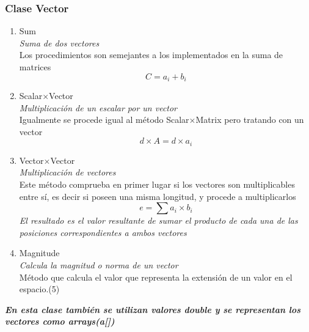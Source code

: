 \documentclass[options]{article}
\begin{document}
\subsubsection{Clase Vector}
\begin{enumerate}
    \item Sum\\
    \textit{Suma de dos vectores}\\
    Los procedimientos son semejantes a los implementados en la suma de matrices
    \begin{equation}
        C = a_{i} + b_{i}
    \end{equation}
    \item Scalar$\times $Vector\\
    \textit{Multiplicación de un escalar por un vector}\\
    Igualmente se procede igual al método Scalar$\times $Matrix pero tratando con un vector
    \begin{equation}
        d \times A = d \times a_{i}
    \end{equation}
    \item Vector$\times $Vector\\
    \textit{Multiplicación de vectores}\\
    Este método comprueba en primer lugar si los vectores son multiplicables entre sí, es decir si poseen una misma longitud, y procede a multiplicarlos
    \begin{equation}
        e = \sum a_{i}\times b_{i}
    \end{equation}
    \textit{El resultado es el valor resultante de sumar el producto de cada una de las posiciones correspondientes a ambos vectores}
    \item Magnitude\\
    \textit{Calcula la magnitud o norma de un vector}\\
    Método que calcula el valor que representa la extensión de un valor en el espacio.(5)
\end{enumerate}
\textbf{\emph{En esta clase también se utilizan valores double y se representan los vectores como arrays(a[])}}
\end{document}
